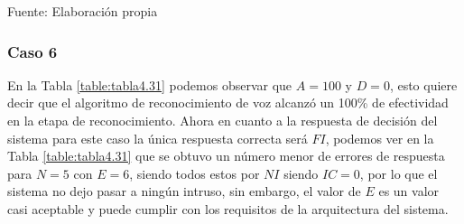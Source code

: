 \begin{center}
\begin{table}[H]
\centering
\caption{\small{Resultados para el caso 5 con U1 estático.}}
\label{table:tabla4.30}
\vskip 0.2cm
\begin{center}
\vskip 0.2cm
{\small{Fuente: Elaboración propia}}
\end{center}
\end{table}
\end{center}

\subsubsection{Caso 6}
En la Tabla \ref{table:tabla4.31} podemos observar que $A = 100$ y $D = 0$, esto quiere decir que el algoritmo de reconocimiento de voz alcanzó un 100\% de efectividad en la etapa de reconocimiento.
\vskip 0.5cm
Ahora en cuanto a la respuesta de decisión del sistema para este caso la única respuesta correcta será $FI$, podemos ver en la Tabla \ref{table:tabla4.31} que se obtuvo un número menor de errores de respuesta para $N = 5$ con $E = 6$, siendo todos estos por $NI$ siendo $IC = 0$, por lo que el sistema no dejo pasar a ningún intruso, sin embargo, el valor de $E$ es un valor casi aceptable y puede cumplir con los requisitos de la arquitectura del sistema.

